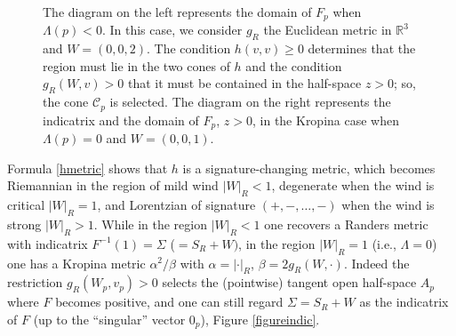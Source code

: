 \documentclass[reqno,10pt]{amsart}
\newcommand{\R}{\mathds R}
\newcommand{\C}{\mathcal{C}}
\begin{document}
\begin{figure}
\caption{\label{figure1}  The  diagram on the left represents  the domain of $F_p$ when $\Lambda(p)<0$. In this case, we consider $g_R$ the Euclidean metric in $\R^3$ and $W=(0,0,2)$. The condition $h(v,v)\geq 0$ determines that the region must lie in the two cones of $h$ and the condition $g_R(W,v)>0$ that it must be contained in the half-space $z>0$; so, the cone $\C_p$ is selected.  The diagram on the right represents the indicatrix and the domain of $F_p$, $z>0$, in the Kropina case when $\Lambda(p)=0$ and $W=(0,0,1)$. }
\end{figure}
Formula 
\eqref{hmetric} shows that $h$ is a signature-changing metric, which becomes Riemannian in the region of mild wind $|W|_R<1$, degenerate when the wind is critical $|W|_R=1$, and Lorentzian of signature $(+,-,\dots , -)$ when the wind is strong $|W|_R>1$. 
While in the region $|W|_R<1$ one 
recovers a Randers metric with indicatrix $F^{-1}(1)=\Sigma$ ($=S_R+W)$, in the region $|W|_R=1$ (i.e., $\Lambda=0$) one has a Kropina metric $
\alpha^2/\beta$ with $\alpha=|\cdot|_R$, 
$\beta= 2 g_R(W,\cdot )$. Indeed the restriction $g_R(W_p,v_p)>0$ selects   the (pointwise) tangent open half-space $A_p$ where $F$ becomes
 positive, and one can still regard 
 $\Sigma=S_R+W$ as the indicatrix of $F$ (up to the ``singular'' vector $0_p$), Figure \ref{figureindic}.
\end{document}

